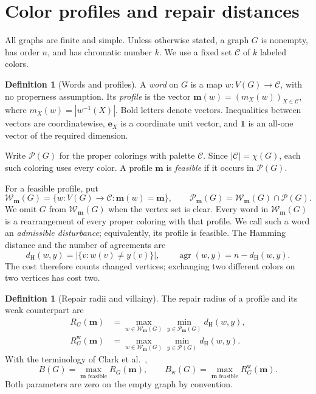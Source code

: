 \documentclass[11pt,reqno]{amsart}
\numberwithin{equation}{section}
\theoremstyle{definition}
\newtheorem{definition}[theorem]{Definition}
\theoremstyle{remark}
\begin{document}
\section{Color profiles and repair distances}\label{sec:preliminaries}

All graphs are finite and simple. Unless otherwise stated, a graph $G$ is
nonempty, has order $n$, and has chromatic number $k$. We use a fixed set
$\mathcal C$ of $k$ labeled colors.

\begin{definition}[Words and profiles]\label{def:profile}
A \emph{word} on $G$ is a map
$w:V(G)\to\mathcal C$, with no properness assumption. Its \emph{profile}
is the vector $\mathbf m(w)=(m_X(w))_{X\in\mathcal C}$, where
$m_X(w)=|w^{-1}(X)|$. Bold letters denote vectors. Inequalities between
vectors are coordinatewise, $\mathbf e_X$ is a coordinate unit vector,
and $\mathbf1$ is an all-one vector of the required dimension.

Write $\mathcal P(G)$ for the proper colorings with palette $\mathcal C$.
Since $|\mathcal C|=\chi(G)$, each such coloring uses every color. A profile
$\mathbf m$ is \emph{feasible} if it occurs in $\mathcal P(G)$.
\end{definition}

For a feasible profile, put
\[
 \mathcal W_{\mathbf m}(G)=
 \{w:V(G)\to\mathcal C:\mathbf m(w)=\mathbf m\},\qquad
 \mathcal P_{\mathbf m}(G)=\mathcal W_{\mathbf m}(G)\cap\mathcal P(G).
\]
We omit $G$ from $\mathcal W_{\mathbf m}(G)$ when the vertex set is clear.
Every word in $\mathcal W_{\mathbf m}(G)$ is a rearrangement of every
proper coloring with that profile. We call such a word an
\emph{admissible disturbance}; equivalently, its profile is feasible.
The Hamming distance and the number
of agreements are
\[
 d_{\mathrm H}(w,y)=|\{v:w(v)\ne y(v)\}|,
 \qquad \operatorname{agr}(w,y)=n-d_{\mathrm H}(w,y).
\]
The cost therefore counts changed vertices; exchanging two different
colors on two vertices has cost two.

\begin{definition}[Repair radii and villainy]\label{def:repair-radii}
The repair radius of a profile and its weak counterpart are
\begin{align*}
 R_G(\mathbf m)&=
 \max_{w\in\mathcal W_{\mathbf m}(G)}
 \min_{y\in\mathcal P_{\mathbf m}(G)}d_{\mathrm H}(w,y),\\
 R^{\mathrm w}_G(\mathbf m)&=
 \max_{w\in\mathcal W_{\mathbf m}(G)}
 \min_{y\in\mathcal P(G)}d_{\mathrm H}(w,y).
\end{align*}
With the terminology of Clark et al.~\cite{clark2006},
\[
 B(G)=\max_{\mathbf m\text{ feasible}}R_G(\mathbf m),\qquad
 B_{\mathrm w}(G)=\max_{\mathbf m\text{ feasible}}R^{\mathrm w}_G(\mathbf m).
\]
Both parameters are zero on the empty graph by convention.
\end{definition}
\end{document}
